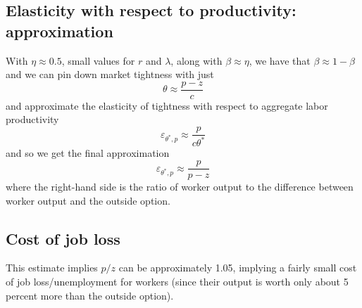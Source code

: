 \documentclass[11pt]{amsart}
\begin{document}
\subsection{Elasticity with respect to productivity: approximation}

With $\eta \approx 0.5$, small values for $r$ and $\lambda$, along with $\beta \approx \eta$, we have that $\beta \approx 1 - \beta$ and we can pin down market tightness with just
\[
\theta \approx \frac{p-z}{c}
\]
and approximate the elasticity of tightness with respect to aggregate labor productivity
\[
\varepsilon_{\theta^*, p} \approx \frac{p}{c\theta^*}
\]
and so we get the final approximation
\[
\varepsilon_{\theta^*, p} \approx \frac{p}{p-z}
\]
where the right-hand side is the ratio of worker output to the difference between worker output and the outside option.

\subsection{Cost of job loss}

This estimate implies $p/z$ can be approximately 1.05, implying a fairly small cost of job loss/unemployment for workers (since their output is worth only about 5 percent more than the outside option).
\end{document}
